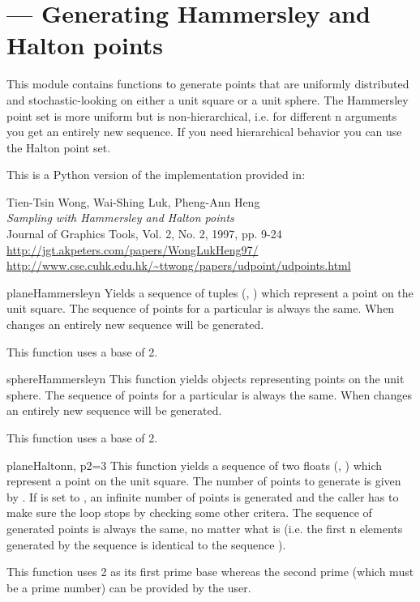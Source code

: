 
\section{ ---
          Generating Hammersley and Halton points}


This module contains functions to generate points that are uniformly
distributed and stochastic-looking on either a unit square or a unit
sphere. The Hammersley point set is more uniform but is
non-hierarchical, i.e. for different n arguments you get an entirely
new sequence. If you need hierarchical behavior you can use the Halton
point set.

This is a Python version of the implementation provided in:

Tien-Tsin Wong, Wai-Shing Luk, Pheng-Ann Heng\\
{\em Sampling with Hammersley and Halton points}\\
Journal of Graphics Tools, Vol. 2, No. 2, 1997, pp. 9-24\\
\url{http://jgt.akpeters.com/papers/WongLukHeng97/}\\
\url{http://www.cse.cuhk.edu.hk/~ttwong/papers/udpoint/udpoints.html}

\begin{funcdesc}{planeHammersley}{n}
Yields a sequence of  tuples (, ) which represent a
point on the unit square. The sequence of points for a particular  is
always the same. When  changes an entirely new sequence will be
generated.
    
This function uses a base of 2.
\end{funcdesc}

\begin{funcdesc}{sphereHammersley}{n}
This function yields   objects representing points
on the unit sphere. The sequence of points for a particular  is
always the same. When  changes an entirely new sequence will be
generated.

This function uses a base of 2.    
\end{funcdesc}

\begin{funcdesc}{planeHalton}{n, p2=3}
This function yields a sequence of two floats (, ) which
represent a point on the unit square. The number of points to generate
is given by . If  is set to , an infinite
number of points is generated and the caller has to make sure the loop
stops by checking some other critera.  The sequence of generated
points is always the same, no matter what  is (i.e. the first n
elements generated by the sequence  is identical to
the sequence ).

This function uses 2 as its first prime base whereas the second
prime  (which must be a prime number) can be provided by the user.
\end{funcdesc}

